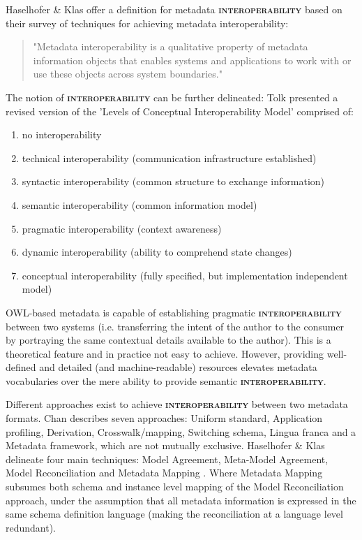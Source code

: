 \documentclass[a4paper,english,twoside,BCOR1.5cm,headsepline,DIV12,appendixprefix,final,12pt]{scrbook}
\newcommand{\interoperability}{{\ttfamily\scshape\bfseries interoperability}\xspace}
\begin{document}
Haselhofer \& Klas offer a definition for metadata \interoperability based on their survey of techniques for achieving metadata interoperability:

\begin{quote}
"Metadata interoperability is a qualitative property of metadata
information objects that enables systems and applications to work with or use
these objects across system boundaries." \cite{Haslhofer2010}
\end{quote}

The notion of \interoperability can be further delineated: Tolk \cite{Tolk} presented a revised version of the 'Levels of Conceptual Interoperability Model' comprised of: 

\begin{enumerate}
\item no interoperability 
\item technical interoperability (communication infrastructure established) 
\item syntactic interoperability (common structure to exchange information)
\item semantic interoperability (common information model)
\item pragmatic interoperability (context awareness)
\item dynamic interoperability (ability to comprehend state changes) 
\item conceptual interoperability (fully specified, but implementation independent model)
\end{enumerate}

OWL-based metadata is capable of establishing pragmatic \interoperability between two systems (i.e. transferring the intent of the author to the consumer by portraying the same contextual details available to the author). This is a theoretical feature and in practice not easy to achieve. However, providing well-defined and detailed (and machine-readable) resources elevates metadata vocabularies over the mere ability to provide semantic \interoperability.

Different approaches exist to achieve \interoperability between two metadata formats. Chan \cite{3dchinauslibraryconference} describes seven approaches: Uniform standard, Application profiling, Derivation, Crosswalk/mapping, Switching schema, Lingua franca and a Metadata framework, which are not mutually exclusive. Haselhofer \& Klas delineate four main techniques: Model Agreement, Meta-Model Agreement, Model Reconciliation and Metadata Mapping \cite{Haslhofer2010}.
Where Metadata Mapping subsumes both schema and instance level mapping of the Model Reconciliation approach, under the assumption that all metadata information is expressed in the same schema definition language (making the reconciliation at a language level redundant).
\end{document}
